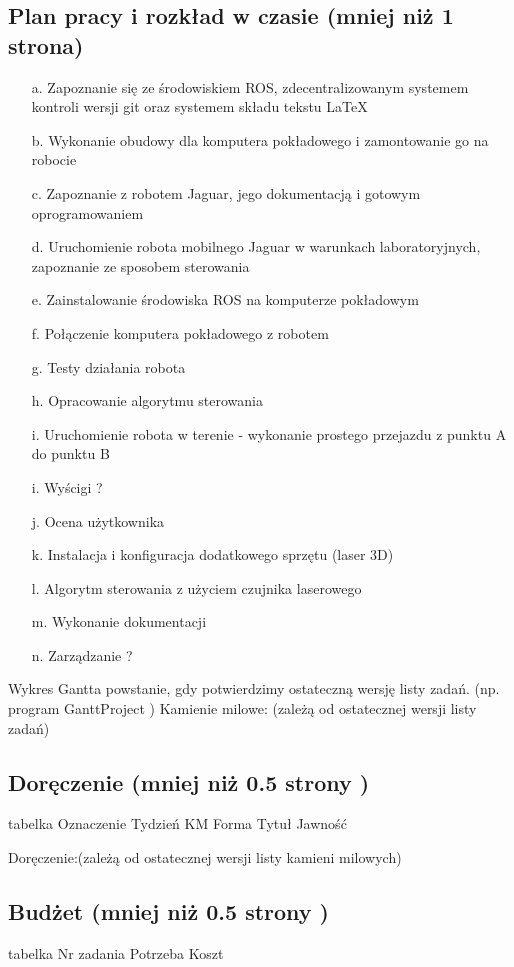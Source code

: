 \subsection{Plan pracy i rozkład w czasie (mniej niż 1 strona)}
\begin{enumerate}
\item[a.] Zapoznanie się ze środowiskiem ROS, zdecentralizowanym systemem kontroli wersji git oraz systemem składu tekstu LaTeX
\item[b.] Wykonanie obudowy dla komputera pokładowego i zamontowanie go na robocie
\item[c.] Zapoznanie z robotem Jaguar, jego dokumentacją i gotowym oprogramowaniem
\item[d.] Uruchomienie robota mobilnego Jaguar w warunkach laboratoryjnych, zapoznanie ze sposobem sterowania
\item[e.] Zainstalowanie środowiska ROS na komputerze pokładowym
\item[f.] Połączenie komputera pokładowego z robotem
\item[g.] Testy działania robota
\item[h.] Opracowanie algorytmu sterowania
\item[i.] Uruchomienie robota w terenie - wykonanie prostego przejazdu z punktu A do punktu B
\item[i.] Wyścigi ?
\item[j.] Ocena użytkownika
\item[k.] Instalacja i konfiguracja dodatkowego sprzętu (laser 3D)
\item[l.] Algorytm sterowania z użyciem czujnika laserowego
\item[m.] Wykonanie dokumentacji
\item[n.] Zarządzanie ?
\end{enumerate}

Wykres Gantta powstanie, gdy potwierdzimy ostateczną wersję listy zadań. (np. program GanttProject )
Kamienie milowe: (zależą od ostatecznej wersji listy zadań)
		
\subsection{Doręczenie (mniej niż 0.5 strony )}
    tabelka
    Oznaczenie	Tydzień	KM	Forma	Tytuł	Jawność
	
	
Doręczenie:(zależą od ostatecznej wersji listy kamieni milowych)			

\subsection{Budżet (mniej niż 0.5 strony )}
	tabelka
	Nr zadania	Potrzeba	Koszt			
													
